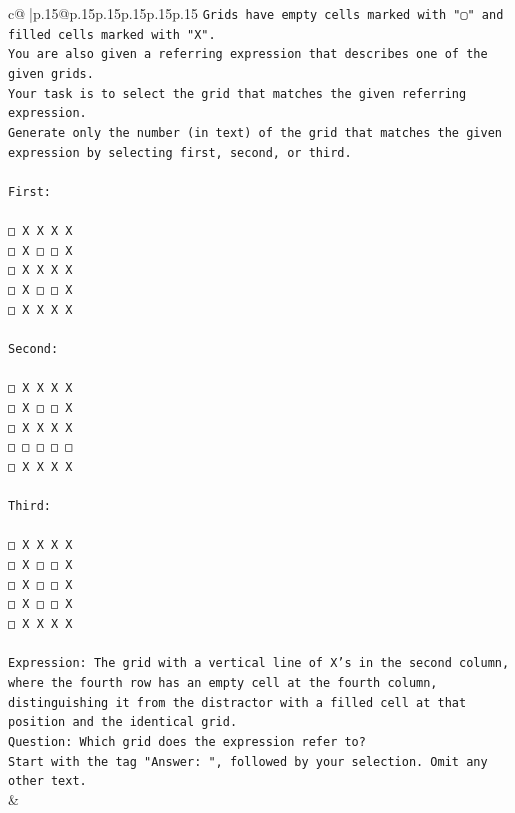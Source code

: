 \documentclass{article}
\begin{document}
{\begin{supertabular}{c@{$\;$}|p{.15\linewidth}@{}p{.15\linewidth}p{.15\linewidth}p{.15\linewidth}p{.15\linewidth}p{.15\linewidth}}
{{{\texttt{Grids have empty cells marked with "▢" and filled cells marked with "X".} \\
\texttt{You are also given a referring expression that describes one of the given grids.} \\
\texttt{Your task is to select the grid that matches the given referring expression.} \\
\texttt{Generate only the number (in text) of the grid that matches the given expression by selecting first, second, or third.} \\
\\ 
\texttt{First:} \\
\\ 
\texttt{□ X X X X} \\
\texttt{□ X □ □ X} \\
\texttt{□ X X X X} \\
\texttt{□ X □ □ X} \\
\texttt{□ X X X X} \\
\\ 
\texttt{Second:} \\
\\ 
\texttt{□ X X X X} \\
\texttt{□ X □ □ X} \\
\texttt{□ X X X X} \\
\texttt{□ □ □ □ □} \\
\texttt{□ X X X X} \\
\\ 
\texttt{Third:} \\
\\ 
\texttt{□ X X X X} \\
\texttt{□ X □ □ X} \\
\texttt{□ X □ □ X} \\
\texttt{□ X □ □ X} \\
\texttt{□ X X X X} \\
\\ 
\texttt{Expression: The grid with a vertical line of X's in the second column, where the fourth row has an empty cell at the fourth column, distinguishing it from the distractor with a filled cell at that position and the identical grid.} \\
\texttt{Question: Which grid does the expression refer to?} \\
\texttt{Start with the tag "Answer: ", followed by your selection. Omit any other text.} \\
            }
        }
    }
    & \\ \\


\end{supertabular}}
\end{document}

